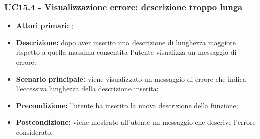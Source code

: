 \subsubsection{UC15.4 - Visualizzazione errore: descrizione troppo lunga}
\begin{itemize}
	\item \textbf{Attori primari:} \us{};
	\item \textbf{Descrizione:} dopo aver inserito una descrizione di lunghezza maggiore rispetto a quella massima consentita l’utente visualizza un messaggio di errore; 
	\item \textbf{Scenario principale:} viene visualizzato un messaggio di errore che indica l’eccessiva lunghezza della descrizione inserita;  
	\item \textbf{Precondizione:} l’utente ha inserito la nuova descrizione della funzione;  
	\item \textbf{Postcondizione:} viene mostrato all’utente un messaggio che descrive l’errore considerato.  
\end{itemize}